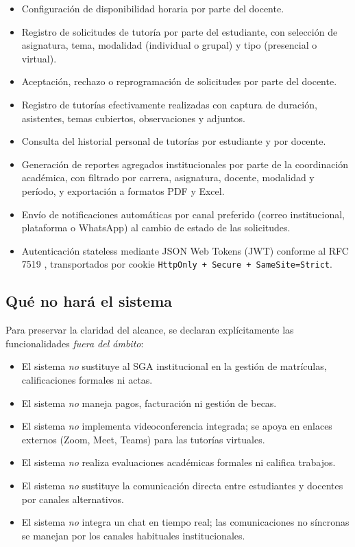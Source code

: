 \documentclass[11pt,a4paper,twoside]{report}
\begin{document}
\begin{itemize}[leftmargin=1.5em,itemsep=2pt]
    \item Configuraci\'on de disponibilidad horaria por parte del docente.
    \item Registro de solicitudes de tutor\'ia por parte del estudiante, con selecci\'on de asignatura, tema, modalidad (individual o grupal) y tipo (presencial o virtual).
    \item Aceptaci\'on, rechazo o reprogramaci\'on de solicitudes por parte del docente.
    \item Registro de tutor\'ias efectivamente realizadas con captura de duraci\'on, asistentes, temas cubiertos, observaciones y adjuntos.
    \item Consulta del historial personal de tutor\'ias por estudiante y por docente.
    \item Generaci\'on de reportes agregados institucionales por parte de la coordinaci\'on acad\'emica, con filtrado por carrera, asignatura, docente, modalidad y per\'iodo, y exportaci\'on a formatos PDF y Excel.
    \item Env\'io de notificaciones autom\'aticas por canal preferido (correo institucional, plataforma o WhatsApp) al cambio de estado de las solicitudes.
    \item Autenticaci\'on stateless mediante JSON Web Tokens (JWT) conforme al RFC 7519 \cite{jones2015jwt}, transportados por cookie \texttt{HttpOnly + Secure + SameSite=Strict}.
\end{itemize}

\subsection{Qu\'e no har\'a el sistema}

Para preservar la claridad del alcance, se declaran expl\'icitamente las funcionalidades \emph{fuera del \'ambito}:

\begin{itemize}[leftmargin=1.5em,itemsep=2pt]
    \item El sistema \emph{no} sustituye al SGA institucional en la gesti\'on de matr\'iculas, calificaciones formales ni actas.
    \item El sistema \emph{no} maneja pagos, facturaci\'on ni gesti\'on de becas.
    \item El sistema \emph{no} implementa videoconferencia integrada; se apoya en enlaces externos (Zoom, Meet, Teams) para las tutor\'ias virtuales.
    \item El sistema \emph{no} realiza evaluaciones acad\'emicas formales ni califica trabajos.
    \item El sistema \emph{no} sustituye la comunicaci\'on directa entre estudiantes y docentes por canales alternativos.
    \item El sistema \emph{no} integra un chat en tiempo real; las comunicaciones no s\'incronas se manejan por los canales habituales institucionales.
\end{itemize}
\end{document}
